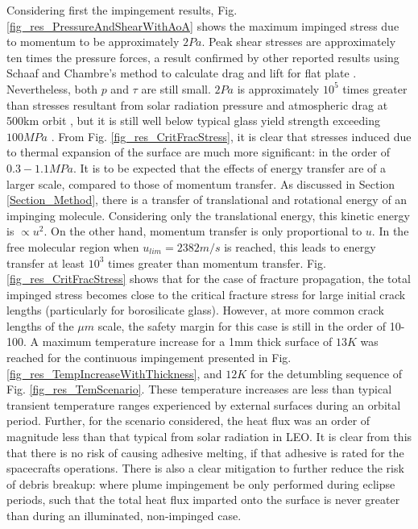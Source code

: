 \documentclass[journal]{new-aiaa}
\begin{document}
Considering first the impingement results, Fig. \ref{fig_res_PressureAndShearWithAoA} shows the maximum impinged stress due to momentum to be approximately $2Pa$. Peak shear stresses are approximately ten times the pressure forces, a result confirmed by other reported results using Schaaf and Chambre's method to calculate drag and lift for flat plate \cite{storchAerodynamicDisturbancesSpacecraft2002}. Nevertheless, both $p$ and $\tau$ are still small. $2Pa$ is approximately $10^5$ times greater than stresses resultant from solar radiation pressure and atmospheric drag at 500km orbit \cite{gilmoreSpacecraftThermalControl2002}, but it is still well below typical glass yield strength exceeding $100MPa$ \cite{ansysAnsysGrantaEduPack2024}. From Fig. \ref{fig_res_CritFracStress}, it is clear that stresses induced due to thermal expansion of the surface are much more significant: in the order of $0.3-1.1MPa$. It is to be expected that the effects of energy transfer are of a larger scale, compared to those of momentum transfer. As discussed in Section \ref{Section_Method}, there is a transfer of translational and rotational energy of an impinging molecule. Considering only the translational energy, this kinetic energy is $\propto u^2$. On the other hand, momentum transfer is only proportional to $u$. In the free molecular region when $u_{lim}=2382m/s$ is reached, this leads to energy transfer at least $10^3$ times greater than momentum transfer. 
Fig. \ref{fig_res_CritFracStress} shows that for the case of fracture propagation, the total impinged stress becomes close to the critical fracture stress for large initial crack lengths (particularly for borosilicate glass). However, at more common crack lengths of the $\mu m$ scale, the safety margin for this case is still in the order of 10-100. 
A maximum temperature increase for a 1mm thick surface of $13K$ was reached for the continuous impingement presented in Fig. \ref{fig_res_TempIncreaseWithThickness}, and $12K$ for the detumbling sequence of Fig. \ref{fig_res_TemScenario}. These temperature increases are less than typical transient temperature ranges experienced by external surfaces during an orbital period. Further, for the scenario considered, the heat flux was an order of magnitude less than that typical from solar radiation in LEO. It is clear from this that there is no risk of causing adhesive melting, if that adhesive is rated for the spacecrafts operations. There is also a clear mitigation to further reduce the risk of debris breakup: where plume impingement be only performed during eclipse periods, such that the total heat flux imparted onto the surface is never greater than during an illuminated, non-impinged case.
\end{document}
